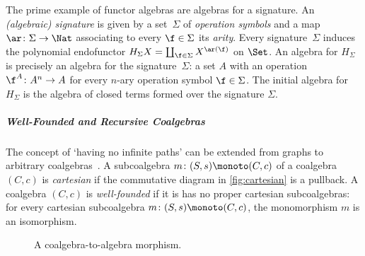 \documentclass[a4paper,UKenglish, autoref, numberwithinsect, final]{lipics-v2021}
\numberwithin{equation}{section}
\theoremstyle{plain}
\theoremstyle{definition}
\begin{document}
\begin{example}
The prime example of functor algebras are algebras for a
signature. An \emph{(algebraic) signature} is given by a set~$\Sigma$
of \emph{operation symbols} and a map $\ar\colon \Sigma\to \Nat$
associating to every $\f\in \Sigma$ its \emph{arity}. Every
signature~$\Sigma$ induces the polynomial endofunctor $H_\Sigma X = \coprod_{\f\in \Sigma} X^{\ar(\f)}$ on $\Set$. An algebra for $H_\Sigma$ is
precisely an algebra for the signature~$\Sigma$: a set $A$ with an operation $\f^A\colon A^n\to A$ for every $n$-ary operation symbol $\f\in \Sigma$. The initial algebra for $H_\Sigma$ is the algebra of closed terms formed over the signature $\Sigma$.
\end{example}




\subparagraph*{Well-Founded and Recursive Coalgebras}\label{sec:prelim:wf-rec}
The concept of `having no infinite paths' can be extended from graphs to arbitrary coalgebras~\cite{taylor99}. A subcoalgebra $m\colon (S,s)\monoto (C,c)$ of a coalgebra $(C,c)$ is \emph{cartesian} if the commutative diagram in \autoref{fig:cartesian} is a pullback. A coalgebra $(C,c)$ is \emph{well-founded} if it is has no proper cartesian subcoalgebras: for every cartesian subcoalgebra $m\colon (S,s)\monoto (C,c)$, the monomorphism $m$ is an isomorphism.
\begin{figure}
  \begin{minipage}{.45\textwidth}\centering
  \caption{A cartesian subcoalgebra.}
  \label{fig:cartesian}
  \end{minipage}\hfill%
  \begin{minipage}{.5\textwidth}\centering
{}
  \caption{A coalgebra-to-algebra morphism.}
  \label{fig:coalg2alg}
  \end{minipage}
\end{figure}
\end{document}
